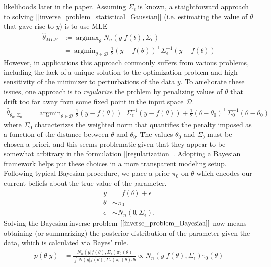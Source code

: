 \documentclass[12pt]{article}
\DeclareMathOperator*{\argmax}{argmax}
\DeclareMathOperator*{\argmin}{argmin}
\begin{document}
likelihoods later in the paper. Assuming $\Sigma_\epsilon$ is known, a staightforward approach to solving [\ref{inverse_problem_statistical_Gaussian}] (i.e. estimating the value of $\theta$ 
that gave rise to $y$) is to use MLE
\begin{align}
\hat{\theta}_{MLE} &:= \argmax_{\theta} N_n(y|f(\theta), \Sigma_\epsilon) \\
			     &= \argmin_{\theta \in \mathcal{D}} \frac{1}{2} (y - f(\theta))^{\top} \Sigma_\epsilon^{-1} (y - f(\theta)) \nonumber
\end{align}
However, in applications this approach commonly suffers from various problems, including the lack of a unique solution to the optimization problem and high sensitivity of the minimizer to perturbations of 
the data $y$. To ameliorate these issues, one approach is to \textit{regularize} the problem by penalizing values of $\theta$ that drift too far away from some fixed point in the input space $\mathcal{D}$. 
\begin{align}
\hat{\theta}_{\theta_0, \Sigma_0} &= \argmin_{\theta \in \mathcal{D}} \frac{1}{2} (y - f(\theta))^{\top} \Sigma_\epsilon^{-1} (y - f(\theta)) + \frac{1}{2} (\theta - \theta_0)^{\top} \Sigma_0^{-1}(\theta - \theta_0) \label{regularization}
\end{align}
where $\Sigma_0$ characterizes the weighted norm that quantifies the penalty imposed as a function of the distance between $\theta$ and $\theta_0$. The values $\theta_0$ and $\Sigma_0$ must be chosen 
a priori, and this seems problematic given that they appear to be somewhat arbitrary in the formulation [\ref{regularization}]. Adopting a Bayesian framework helps put these choices in a more transparent 
modeling setup. Following typical Bayesian procedure, we place a prior $\pi_0$ on $\theta$ which encodes our current beliefs about the true value of the parameter. 
\begin{align}
y &= f(\theta) + \epsilon \label{inverse_problem_Bayesian} \\
\theta &\sim \pi_0 \\
\epsilon &\sim N_n(0, \Sigma_\epsilon) \nonumber.
\end{align}
Solving the Bayesian inverse problem $[\ref{inverse_problem_Bayesian}]$ now means obtaining (or summarizing) the posterior distribution of the parameter given the data, which is calculated via Bayes' rule. 
\begin{align}
p(\theta|y) &= \frac{N_n(y|f(\theta), \Sigma_\epsilon)\pi_0(\theta)}{\int N(y|f(\theta), \Sigma_\epsilon)\pi_0(\theta) d\theta} \propto N_n(y|f(\theta), \Sigma_\epsilon)\pi_0(\theta) \label{posterior}
\end{align}
\end{document}
